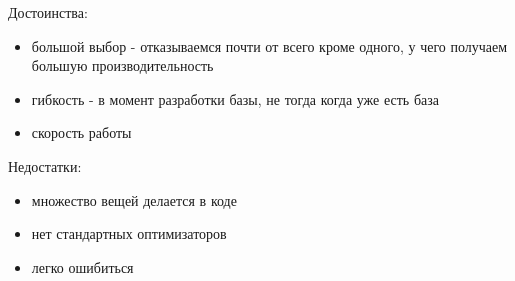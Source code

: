 Достоинства:
\begin{itemize}
	\item большой выбор - отказываемся почти от всего кроме одного, у чего получаем большую производительность
	\item гибкость - в момент разработки базы, не тогда когда уже есть база
	\item скорость работы
\end{itemize}

Недостатки:
\begin{itemize}
	\item множество вещей делается в коде
	\item нет стандартных оптимизаторов
	\item легко ошибиться
\end{itemize}
